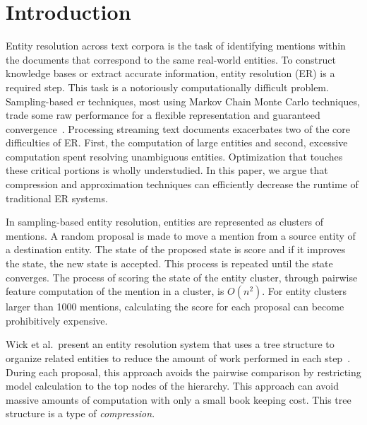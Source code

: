 
\section{Introduction}

Entity resolution across text corpora is the task of identifying mentions 
within the documents that correspond to the same real-world entities.
To construct knowledge bases or extract accurate information, entity resolution (ER) is a
required step.
This task is a notoriously computationally difficult problem.
Sampling-based er techniques, most using Markov Chain Monte Carlo techniques, trade some raw performance for a flexible representation 
and guaranteed convergence~\cite{mccallum03towardconditional,singh2011large,wick2013discriminative}.
Processing streaming text documents exacerbates two of the core difficulties of ER.\@
First, the computation of large entities and second, excessive
computation spent resolving unambiguous entities.
Optimization that touches these critical portions is wholly understudied.
In this paper, we argue that compression and approximation 
techniques can efficiently decrease the runtime of traditional ER systems.

In sampling-based entity resolution, entities are represented as clusters of mentions.
A random proposal is made to move a mention from a source entity of a destination entity.
The state of the proposed state is score and if it improves the state, the new state is accepted.
This process is repeated until the state converges.
The process of scoring the state of the entity cluster, through pairwise feature computation of the mention in a cluster,  is $O(n^2)$.
For entity clusters larger than 1000 mentions, calculating the score for each proposal can become prohibitively expensive.

Wick et al.\ present an entity resolution system that uses a tree structure
to organize related entities to reduce the amount of work performed in each step~\cite{wick2013discriminative}.
During each proposal, this approach avoids the pairwise comparison by restricting model calculation to the top nodes of the hierarchy.
This approach can avoid massive amounts of computation with only a small book keeping cost.
This tree structure is a type of \textit{compression}.

